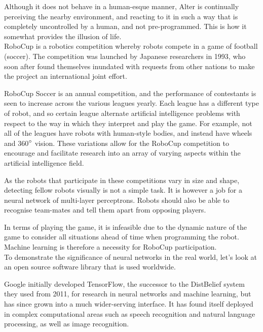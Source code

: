 \documentclass[12pt,a4paper]{article}
\begin{document}
Although it does not behave in a human-esque manner, Alter is continually perceiving the nearby environment, and reacting to it in such a way that is completely uncontrolled by a human, and not pre-programmed. This is how it somewhat provides the illusion of life. \\

RoboCup\citep{23} is a robotics competition whereby robots compete in a game of football (soccer). The competition was launched by Japanese researchers in 1993, who soon after found themselves inundated with requests from other nations to make the project an international joint effort\citep{23}. 

RoboCup Soccer is an annual competition, and the performance of contestants is seen to increase across the various leagues yearly\citep{30}. Each league has a different type of robot, and so certain league alternate artificial intelligence problems with respect to the way in which they interpret and play the game. For example, not all of the leagues have robots with human-style bodies, and instead have wheels and 360$\degree$ vision. These variations allow for the RoboCup competition to encourage and facilitate research into an array of varying aspects within the artificial intelligence field. 

As the robots that participate in these competitions vary in size and shape, detecting fellow robots visually is not a simple task. It is however a job for a neural network of multi-layer perceptrons\citep{24}. Robots should also be able to recognise team-mates and tell them apart from opposing players. 

In terms of playing the game, it is infeasible due to the dynamic nature of the game to consider all situations ahead of time when programming the robot\citep{25}. Machine learning is therefore a necessity for RoboCup participation.\\

To demonstrate the significance of neural networks in the real world, let's look at an open source software library that is used worldwide. 

Google initially developed TensorFlow, the successor to the DistBelief system they used from 2011\citep{19}, for research in neural networks and machine learning\citep{17}, but has since grown into a much wider-serving interface. It has found itself deployed in complex computational areas such as speech recognition and natural language processing, as well as image recognition\citep{18}. 
\end{document}
